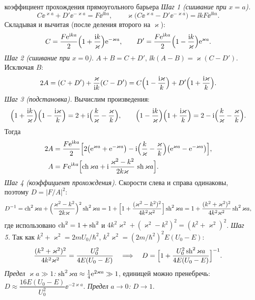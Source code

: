 \begin{derivation}[label=der:7:barrier]{коэффициент прохождения прямоугольного барьера}
\emph{Шаг 1 (сшивание при $x=a$).}
\[
  C\ee^{\varkappa a}+D'\ee^{-\varkappa a}=F\ee^{\ii ka},\qquad
  \varkappa\bigl(C\ee^{\varkappa a}-D'\ee^{-\varkappa a}\bigr)=\ii kF\ee^{\ii ka}.
\]
Складывая и вычитая (после деления второго на $\varkappa$):
\[
  C=\frac{F\mathrm{e}^{\mathrm{i} ka}}{2}\Bigl(1+\frac{\mathrm{i} k}{\varkappa}\Bigr)\mathrm{e}^{-\varkappa a},\qquad
  D'=\frac{F\mathrm{e}^{\mathrm{i} ka}}{2}\Bigl(1-\frac{\mathrm{i} k}{\varkappa}\Bigr)\mathrm{e}^{\varkappa a}.
\]
\emph{Шаг 2 (сшивание при $x=0$).} $A+B=C+D'$, $\ii k(A-B)=\varkappa(C-D')$. Исключая $B$:
\[
  2A=(C+D')+\frac{\varkappa}{\mathrm{i} k}(C-D')=C\Bigl(1-\frac{\mathrm{i}\varkappa}{k}\Bigr)+D'\Bigl(1+\frac{\mathrm{i}\varkappa}{k}\Bigr).
\]
\emph{Шаг 3 (подстановка).} Вычислим произведения:
\[
  \Bigl(1+\frac{\mathrm{i} k}{\varkappa}\Bigr)\Bigl(1-\frac{\mathrm{i}\varkappa}{k}\Bigr)=2+\mathrm{i}\Bigl(\frac k\varkappa-\frac\varkappa k\Bigr),\qquad
  \Bigl(1-\frac{\mathrm{i} k}{\varkappa}\Bigr)\Bigl(1+\frac{\mathrm{i}\varkappa}{k}\Bigr)=2-\mathrm{i}\Bigl(\frac k\varkappa-\frac\varkappa k\Bigr).
\]
Тогда
\begin{align*}
  2A&=\frac{F\mathrm{e}^{\mathrm{i} ka}}{2}\Bigl[2\bigl(\mathrm{e}^{\varkappa a}+\mathrm{e}^{-\varkappa a}\bigr)
     -\mathrm{i}\Bigl(\frac k\varkappa-\frac\varkappa k\Bigr)\bigl(\mathrm{e}^{\varkappa a}-\mathrm{e}^{-\varkappa a}\bigr)\Bigr],\\
  A&=F\mathrm{e}^{\mathrm{i} ka}\Bigl[\operatorname{ch}\varkappa a+\mathrm{i}\,\frac{\varkappa^2-k^2}{2k\varkappa}\,\operatorname{sh}\varkappa a\Bigr].
\end{align*}
\emph{Шаг 4 (коэффициент прохождения).} Скорости слева и справа одинаковы, поэтому $D=|F/A|^2$:
\[
  D^{-1}=\operatorname{ch}^2\varkappa a+\Bigl(\frac{\varkappa^2-k^2}{2k\varkappa}\Bigr)^2\operatorname{sh}^2\varkappa a
  =1+\Bigl[1+\frac{(\varkappa^2-k^2)^2}{4k^2\varkappa^2}\Bigr]\operatorname{sh}^2\varkappa a
  =1+\frac{(k^2+\varkappa^2)^2}{4k^2\varkappa^2}\operatorname{sh}^2\varkappa a ,
\]
где использовано $\operatorname{ch}^2=1+\operatorname{sh}^2$ и $4k^2\varkappa^2+(\varkappa^2-k^2)^2=(k^2+\varkappa^2)^2$.
\emph{Шаг 5.} Так как $k^2+\varkappa^2=2mU_0/\hbar^2$, $k^2\varkappa^2=(2m/\hbar^2)^2E(U_0-E)$:
\[
  \frac{(k^2+\varkappa^2)^2}{4k^2\varkappa^2}=\frac{U_0^2}{4E(U_0-E)}
  \quad\Longrightarrow\quad
  D=\Bigl[1+\frac{U_0^2\operatorname{sh}^2\varkappa a}{4E(U_0-E)}\Bigr]^{-1}.
\]
\emph{Предел $\varkappa a\gg1$:} $\operatorname{sh}^2\varkappa a\approx\frac14\mathrm{e}^{2\varkappa a}\gg1$, единицей можно пренебречь:
$D\approx\dfrac{16E(U_0-E)}{U_0^2}\ee^{-2\varkappa a}$. \emph{Предел $a\to0$:} $D\to1$.
\end{derivation}

